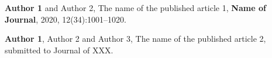 

\begin{researchpage}

\begin{biblist}
\item \textbf{Author 1} and Author 2, The name of the published article 1, \textbf{Name of Journal}, 2020, 12(34):1001--1020.

\item {\textbf{Author 1},  Author 2 and Author 3}, The name of the published article 2, submitted to Journal of XXX.
\end{biblist}

%

\end{researchpage}

